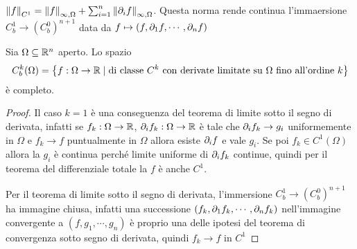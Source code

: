 $\left\Vert{f}\right\Vert_{C^1}=\left\Vert{f}\right\Vert_{\infty,\Omega}+\sum_{i=1}^n\left\Vert{\partial_i f}\right\Vert_{\infty,\Omega}$. Questa norma rende continua l'immaersione $C^1_b\to (C_b^0)^{n+1}$ data da $f\mapsto(f,\partial_1f,\cdots,\partial_n f)$

\begin{proposition}
Sia $\Omega\subseteq \mathbb{R}^n$ aperto. Lo spazio 
\[C^k_b(\Omega)=\left\{{f:\Omega\to\mathbb{R}\mid \text{di classe $C^k$ con derivate limitate su $\Omega$ fino all'ordine $k$}}\right\}\]
\`e completo.
\end{proposition}
\begin{proof}
Il caso $k=1$ \`e una conseguenza del teorema di limite sotto il segno di derivata, infatti se $f_k:\Omega\to \mathbb{R}$, $\partial_i f_k:\Omega\to\mathbb{R}$ \`e tale che $\partial_i f_k\to g_i$ uniformemente in $\Omega$ e $f_k\to f$ puntualmente in $\Omega$ allora esiste $\partial_i f$ e vale $g_i$. Se poi $f_k\in C^1(\Omega)$ allora la $g_i$ \`e continua perch\'e limite uniforme di $\partial_i f_k$ continue, quindi per il teorema del differenziale totale la $f$ \`e anche $C^1$.

Per il teorema di limite sotto il segno di derivata, l'immersione $C^1_b\to (C_b^0)^{n+1}$ ha immagine chiusa, infatti una successione $(f_k,\partial_1f_k,\cdots,\partial_nf_k)$ nell'immagine convergente a $(f,g_1,\cdots, g_n)$ \`e proprio una delle ipotesi del teorema di convergenza sotto segno di derivata, quindi $f_k\to f$ in $C^1$
\end{proof}